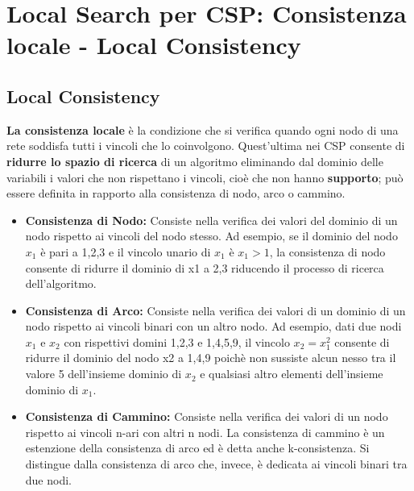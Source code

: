 \chapter{Local Search per CSP: Consistenza locale - Local Consistency} \label{ch:Local Search per Crisp CSP: Consistenza locale}
\section{Local Consistency}
\textbf{La consistenza locale} è la condizione che si verifica quando ogni nodo di una rete soddisfa tutti i vincoli che lo coinvolgono. Quest’ultima nei CSP consente di \textbf{ridurre lo spazio di ricerca} di un algoritmo eliminando dal dominio delle variabili i valori che non rispettano i vincoli, cioè che non hanno \textbf{supporto}; può essere definita in rapporto alla consistenza di nodo, arco o cammino.
\begin{itemize}
    \item \textbf{Consistenza di Nodo:} Consiste nella verifica dei valori del dominio di un nodo rispetto ai vincoli del nodo stesso. Ad esempio, se il dominio del nodo $x_1$ è pari a 1,2,3 e il vincolo unario di $x_1$ è $x_1 > 1$, la consistenza di nodo consente di ridurre il dominio di x1 a 2,3 riducendo il processo di ricerca dell’algoritmo.
    \item \textbf{Consistenza di Arco:} Consiste nella verifica dei valori di un dominio di un nodo rispetto ai vincoli binari con un altro nodo. Ad esempio, dati due nodi $x_1$ e $x_2$ con rispettivi domini 1,2,3 e 1,4,5,9, il vincolo $x_2 = x_{1}^2$ consente di ridurre il dominio del nodo x2 a 1,4,9 poichè non sussiste alcun nesso tra il valore 5 dell’insieme dominio di $x_2$ e qualsiasi altro elementi dell’insieme dominio di $x_1$.
    \newpage
    \item \textbf{Consistenza di Cammino:} Consiste nella verifica dei valori di un nodo rispetto ai vincoli n-ari con altri n nodi. La consistenza di cammino è un estenzione della consistenza di arco ed è detta anche k-consistenza. Si distingue dalla consistenza di arco che, invece, è dedicata ai vincoli binari tra due nodi.
\end{itemize}
